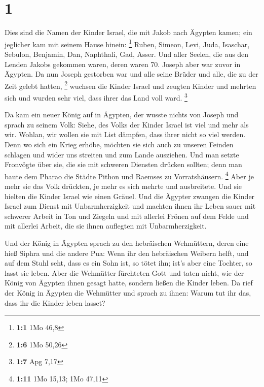 \hypertarget{section}{%
\section{1}\label{section}}

 Dies sind die Namen der Kinder Israel, die mit Jakob nach
Ägypten kamen; ein jeglicher kam mit seinem Hause hinein: \footnote{\textbf{1:1}
  1Mo 46,8}  Ruben, Simeon, Levi, Juda, 
Isaschar, Sebulon, Benjamin,  Dan, Naphthali, Gad, Asser.
 Und aller Seelen, die aus den Lenden Jakobs gekommen
waren, deren waren 70. Joseph aber war zuvor in Ägypten. 
Da nun Joseph gestorben war und alle seine Brüder und alle, die zu der
Zeit gelebt hatten, \footnote{\textbf{1:6} 1Mo 50,26} 
wuchsen die Kinder Israel und zeugten Kinder und mehrten sich und wurden
sehr viel, dass ihrer das Land voll ward. \footnote{\textbf{1:7} Apg
  7,17}

 Da kam ein neuer König auf in Ägypten, der wusste nichts
von Joseph  und sprach zu seinem Volk: Siehe, des Volks
der Kinder Israel ist viel und mehr als wir.  Wohlan, wir
wollen sie mit List dämpfen, dass ihrer nicht so viel werden. Denn wo
sich ein Krieg erhöbe, möchten sie sich auch zu unseren Feinden schlagen
und wider uns streiten und zum Lande ausziehen.  Und man
setzte Fronvögte über sie, die sie mit schweren Diensten drücken
sollten; denn man baute dem Pharao die Städte Pithon und Raemses zu
Vorratshäusern. \footnote{\textbf{1:11} 1Mo 15,13; 1Mo 47,11}
 Aber je mehr sie das Volk drückten, je mehr es sich
mehrte und ausbreitete. Und sie hielten die Kinder Israel wie einen
Gräuel.  Und die Ägypter zwangen die Kinder Israel zum
Dienst mit Unbarmherzigkeit  und machten ihnen ihr Leben
sauer mit schwerer Arbeit in Ton und Ziegeln und mit allerlei Frönen auf
dem Felde und mit allerlei Arbeit, die sie ihnen auflegten mit
Unbarmherzigkeit.

 Und der König in Ägypten sprach zu den hebräischen
Wehmüttern, deren eine hieß Siphra und die andere Pua: 
Wenn ihr den hebräischen Weibern helft, und auf dem Stuhl seht, dass es
ein Sohn ist, so tötet ihn; ist's aber eine Tochter, so lasst sie leben.
 Aber die Wehmütter fürchteten Gott und taten nicht, wie
der König von Ägypten ihnen gesagt hatte, sondern ließen die Kinder
leben.  Da rief der König in Ägypten die Wehmütter und
sprach zu ihnen: Warum tut ihr das, dass ihr die Kinder leben lasset?

